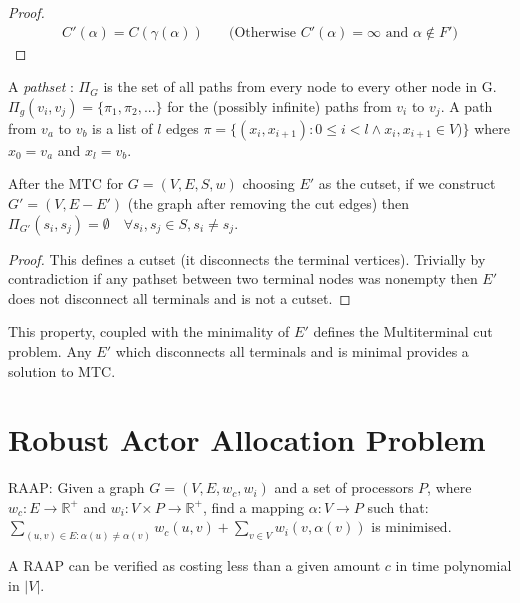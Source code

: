 \documentclass{article}
\begin{document}
\begin{proof}
\begin{align}
	\nonumber C'(\alpha) = C(\gamma(\alpha)) & \quad \mbox{(Otherwise $C'(\alpha) = \infty$ and $\alpha \not\in F'$)}
\end{align}
\end{proof}

\begin{definition}
	A {\em pathset} : $\Pi_G$ is the set of all paths from every node to every other node in G.
	$\Pi_g(v_i, v_j) = \{\pi_1, \pi_2, ... \}$ for the (possibly infinite) paths from $v_i$ to $v_j$.
	A path from $v_a$ to $v_b$ is a list of $l$ edges $\pi =\{(x_i, x_{i+1}) : 0 \leq i < l \wedge x_i, x_{i+1} \in V)\}$ where $x_0 = v_a$ and $x_l = v_b$.
\end{definition}

\begin{observation}
	After the MTC for $G=(V,E,S,w)$ choosing $E'$ as the cutset, if we construct $G'=(V,E-E')$ (the graph after removing the cut edges) then $\Pi_{G'}(s_i, s_j) = \emptyset \quad \forall s_i, s_j \in S, s_i \neq s_j$.
\end{observation}

\begin{proof}
	This defines a cutset (it disconnects the terminal vertices).
	Trivially by contradiction if any pathset between two terminal nodes was nonempty then $E'$ does not disconnect all terminals and is not a cutset.
\end{proof}

This property, coupled with the minimality of $E'$ defines the Multiterminal cut problem.
Any $E'$ which disconnects all terminals and is minimal provides a solution to MTC.

\section{Robust Actor Allocation Problem}
RAAP: Given a graph $G=(V,E,w_c,w_i)$ and a set of processors $P$, where $w_c : E \rightarrow \mathbb{R}^+$ and $w_i : V \times P \rightarrow \mathbb{R}^+$, find a mapping $\alpha : V \rightarrow P$ such that:
$\displaystyle\sum\limits_{(u,v) \in E : \alpha(u) \neq \alpha(v)} w_c(u,v) + \displaystyle\sum\limits_{v \in V} w_i(v, \alpha(v))$ is minimised.

\begin{observation}
\label{RAAPNP}
A RAAP can be verified as costing less than a given amount $c$ in time polynomial in $|V|$.
\end{observation}
\end{document}
